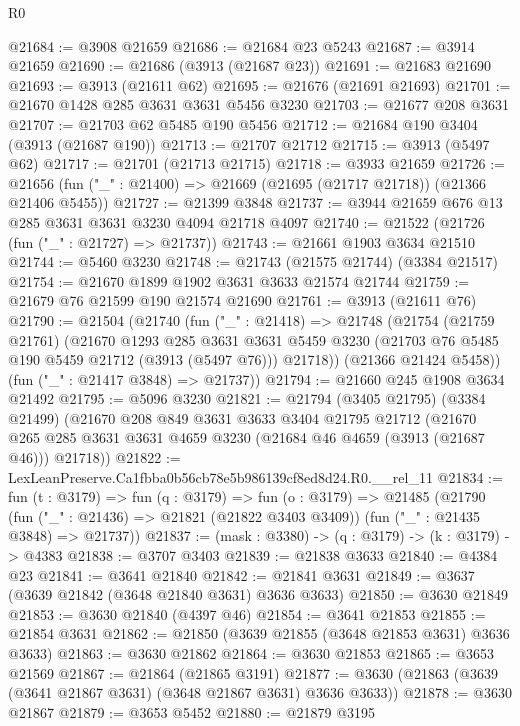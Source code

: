 \begin{lexlean}{R0}
\begin{coremodule}
@21684 := @3908 @21659
@21686 := @21684 @23 @5243
@21687 := @3914 @21659
@21690 := @21686 (@3913 (@21687 @23))
@21691 := @21683 @21690
@21693 := @3913 (@21611 @62)
@21695 := @21676 (@21691 @21693)
@21701 := @21670 @1428 @285 @3631 @3631 @5456 @3230
@21703 := @21677 @208 @3631
@21707 := @21703 @62 @5485 @190 @5456
@21712 := @21684 @190 @3404 (@3913 (@21687 @190))
@21713 := @21707 @21712
@21715 := @3913 (@5497 @62)
@21717 := @21701 (@21713 @21715)
@21718 := @3933 @21659
@21726 := @21656 (fun ("_" : @21400) => @21669 (@21695 (@21717 @21718)) (@21366 @21406 @5455))
@21727 := @21399 @3848
@21737 := @3944 @21659 @676 @13 @285 @3631 @3631 @3230 @4094 @21718 @4097
@21740 := @21522 (@21726 (fun ("_" : @21727) => @21737))
@21743 := @21661 @1903 @3634 @21510
@21744 := @5460 @3230
@21748 := @21743 (@21575 @21744) (@3384 @21517)
@21754 := @21670 @1899 @1902 @3631 @3633 @21574 @21744
@21759 := @21679 @76 @21599 @190 @21574 @21690
@21761 := @3913 (@21611 @76)
@21790 := @21504
    (@21740
      (fun ("_" : @21418) =>
      @21748
        (@21754
          (@21759 @21761)
          (@21670
            @1293
            @285
            @3631
            @3631
            @5459
            @3230
            (@21703 @76 @5485 @190 @5459 @21712 (@3913 (@5497 @76)))
            @21718))
        (@21366 @21424 @5458))
      (fun ("_" : @21417 @3848) => @21737))
@21794 := @21660 @245 @1908 @3634 @21492
@21795 := @5096 @3230
@21821 := @21794
    (@3405 @21795)
    (@3384 @21499)
    (@21670
      @208
      @849
      @3631
      @3633
      @3404
      @21795
      @21712
      (@21670 @265 @285 @3631 @3631 @4659 @3230 (@21684 @46 @4659 (@3913 (@21687 @46))) @21718))
@21822 := LexLeanPreserve.Ca1fbba0b56cb78e5b986139cf8ed8d24.R0.__rel_11
@21834 := fun (t : @3179) =>
  fun (q : @3179) =>
  fun (o : @3179) =>
  @21485
    (@21790
      (fun ("_" : @21436) => @21821 (@21822 @3403 @3409))
      (fun ("_" : @21435 @3848) => @21737))
@21837 := (mask : @3380) -> (q : @3179) -> (k : @3179) -> @4383
@21838 := @3707 @3403
@21839 := @21838 @3633
@21840 := @4384 @23
@21841 := @3641 @21840
@21842 := @21841 @3631
@21849 := @3637 (@3639 @21842 (@3648 @21840 @3631) @3636 @3633)
@21850 := @3630 @21849
@21853 := @3630 @21840 (@4397 @46)
@21854 := @3641 @21853
@21855 := @21854 @3631
@21862 := @21850 (@3639 @21855 (@3648 @21853 @3631) @3636 @3633)
@21863 := @3630 @21862
@21864 := @3630 @21853
@21865 := @3653 @21569
@21867 := @21864 (@21865 @3191)
@21877 := @3630 (@21863 (@3639 (@3641 @21867 @3631) (@3648 @21867 @3631) @3636 @3633))
@21878 := @3630 @21867
@21879 := @3653 @5452
@21880 := @21879 @3195

\end{coremodule}
\end{lexlean}
